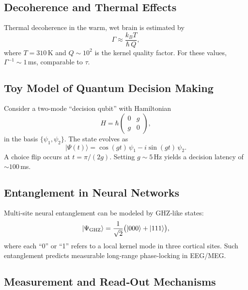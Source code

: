 \subsection{Decoherence and Thermal Effects}

Thermal decoherence in the warm, wet brain is estimated by
\begin{equation}\label{eq:decoherence_rate}
\Gamma \approx \frac{k_B T}{\hbar\,Q},
\end{equation}
where \(T=310\)\,K and \(Q\sim10^2\) is the kernel quality factor.  For these values,
\(\Gamma^{-1}\sim1\)\,ms, comparable to \(\tau\).

\subsection{Toy Model of Quantum Decision Making}

Consider a two-mode “decision qubit” with Hamiltonian
\begin{equation}\label{eq:decision_H}
H = \hbar
\begin{pmatrix}
0 & g \\[4pt]
g & 0
\end{pmatrix},
\end{equation}
in the basis \(\{\psi_1,\psi_2\}\).  The state evolves as
\begin{equation}\label{eq:rabi_solution}
|\Psi(t)\rangle
= \cos(g t)\,\psi_1 - i\sin(g t)\,\psi_2.
\end{equation}
A choice flip occurs at \(t = \pi/(2g)\).  Setting \(g\sim5\)\,Hz yields a decision latency of \(\sim100\)\,ms.

\subsection{Entanglement in Neural Networks}

Multi‐site neural entanglement can be modeled by GHZ‐like states:
\begin{equation}\label{eq:ghz_state}
|\Psi_{\rm GHZ}\rangle
= \frac{1}{\sqrt2}\bigl(|000\rangle + |111\rangle\bigr),
\end{equation}
where each “0” or “1” refers to a local kernel mode in three cortical sites.  Such entanglement predicts measurable long‐range phase‐locking in EEG/MEG.

\subsection{Measurement and Read‐Out Mechanisms}

